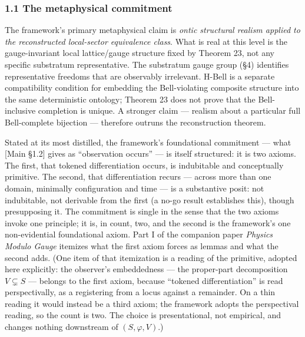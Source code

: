 \documentclass[
]{article}
\begin{document}
\hypertarget{the-metaphysical-commitment}{%
\subsubsection{1.1 The metaphysical
commitment}\label{the-metaphysical-commitment}}

The framework's primary metaphysical claim is \emph{ontic structural
realism applied to the reconstructed local-sector equivalence class}.
What is real at this level is the gauge-invariant local lattice/gauge
structure fixed by Theorem 23, not any specific substratum
representative. The substratum gauge group (§4) identifies
representative freedoms that are observably irrelevant. H-Bell is a
separate compatibility condition for embedding the Bell-violating
composite structure into the same deterministic ontology; Theorem 23
does not prove that the Bell-inclusive completion is unique. A stronger
claim --- realism about a particular full Bell-complete bijection ---
therefore outruns the reconstruction theorem.

Stated at its most distilled, the framework's foundational commitment
--- what {[}Main §1.2{]} gives as ``observation occurs'' --- is itself
structured: it is two axioms. The first, that tokened differentiation
occurs, is indubitable and conceptually primitive. The second, that
differentiation recurs --- across more than one domain, minimally
configuration and time --- is a substantive posit: not indubitable, not
derivable from the first (a no-go result establishes this), though
presupposing it. The commitment is single in the sense that the two
axioms invoke one principle; it is, in count, two, and the second is the
framework's one non-evidential foundational axiom. Part I of the
companion paper \emph{Physics Modulo Gauge} itemizes what the first
axiom forces as lemmas and what the second adds. (One item of that
itemization is a reading of the primitive, adopted here explicitly: the
observer's embeddedness --- the proper-part decomposition
\(V \subsetneq S\) --- belongs to the first axiom, because ``tokened
differentiation'' is read perspectivally, as a registering from a locus
against a remainder. On a thin reading it would instead be a third
axiom; the framework adopts the perspectival reading, so the count is
two. The choice is presentational, not empirical, and changes nothing
downstream of \((S, \varphi, V)\).)
\end{document}
